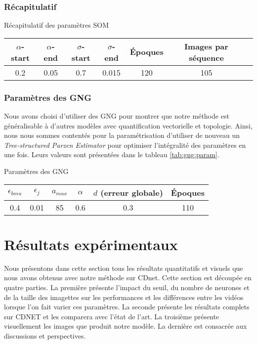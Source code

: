 	\subsubsection{Récapitulatif}\label{sec:param:recap}

	\begin{tableth}
	\caption[Récapitulatif des paramètres SOM]{Récapitulatif des paramètres SOM}
	\begin{tabular}{|cc|cc|c|c|c|}
		\hline
		$\alpha$-start	& $\alpha$-end & $\sigma$-start & $\sigma$-end & Époques & Images par séquence\\
		\hline
		0.2 & 0.05 & 0.7 & 0.015 & 120 & 105\\
		\hline
	\end{tabular}\label{tab:recap:param}
	\end{tableth}
	
	\subsubsection{Paramètres des GNG}

	Nous avons choisi d'utiliser des GNG pour montrer que notre méthode est généralisable à d'autres modèles avec quantification vectorielle et topologie. Ainsi, nous nous sommes contentés pour la paramétrisation d'utiliser de nouveau un \textit{Tree-structured Parzen Estimator} pour optimiser l'intégralité des paramètres en une fois. Leurs valeurs sont présentées dans le tableau \ref{tab:gng:param}.

	\begin{tableth}
	\caption[Paramètres GNG]{Paramètres des GNG}
	\begin{tabular}{|c|c|c|c|c|c|}
		\hline
		$\epsilon_{bmu}$ & $\epsilon_{j}$ & $a_{max}$ & $\alpha$ & $d$ (erreur globale) & Époques\\
		\hline
		0.4 & 0.01 & 85 & 0.6 & 0.3 & 110\\
		\hline
	\end{tabular}\label{tab:gng:param}
	\end{tableth}



	\newpage

	\section{Résultats expérimentaux}

	Nous présentons dans cette section tous les résultats quantitatifs et visuels que nous avons obtenus avec notre méthode sur CDnet. Cette section est découpée en quatre parties. La première présente l'impact du seuil, du nombre de neurones et de la taille des imagettes sur les performances et les différences entre les vidéos lorsque l'on fait varier ces paramètres. La seconde présente les résultats complets sur CDNET et les comparera avec l'état de l'art. La troisième présente visuellement les images que produit notre modèle. La dernière est consacrée aux discussions et perspectives.

